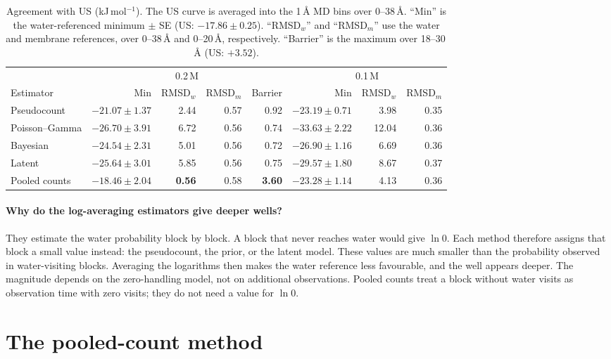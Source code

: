 \documentclass[11pt,a4paper]{article}
\begin{document}
\begin{table}[H]
\centering
\caption{Agreement with US (kJ\,mol$^{-1}$). The US curve is averaged into the 1\,\AA{} MD bins
over 0--38\,\AA{}. ``Min'' is the water-referenced minimum $\pm$ SE (US: $-17.86 \pm 0.25$).
``RMSD$_w$'' and ``RMSD$_m$'' use the water and membrane references, over 0--38\,\AA{} and
0--20\,\AA, respectively. ``Barrier'' is the maximum over 18--30\,\AA{} (US: $+3.52$).}
\label{tab:us}
\small
\setlength{\tabcolsep}{4pt}
\begin{tabular}{l rrrr rrr}
\toprule
 & \multicolumn{4}{c}{0.2\,M} & \multicolumn{3}{c}{0.1\,M} \\
\cmidrule(lr){2-5}\cmidrule(lr){6-8}
Estimator & Min & RMSD$_w$ & RMSD$_m$ & Barrier & Min & RMSD$_w$ & RMSD$_m$ \\
\midrule
Pseudocount   & $-21.07 \pm 1.37$ & 2.44 & 0.57 & 0.92 & $-23.19 \pm 0.71$ & 3.98 & 0.35 \\
Poisson--Gamma& $-26.70 \pm 3.91$ & 6.72 & 0.56 & 0.74 & $-33.63 \pm 2.22$ & 12.04 & 0.36 \\
Bayesian      & $-24.54 \pm 2.31$ & 5.01 & 0.56 & 0.72 & $-26.90 \pm 1.16$ & 6.69 & 0.36 \\
Latent        & $-25.64 \pm 3.01$ & 5.85 & 0.56 & 0.75 & $-29.57 \pm 1.80$ & 8.67 & 0.37 \\
Pooled counts & $\mathbf{-18.46 \pm 2.04}$ & \textbf{0.56} & 0.58 & \textbf{3.60} & $-23.28 \pm 1.14$ & 4.13 & 0.36 \\
\bottomrule
\end{tabular}
\end{table}

\paragraph{Why do the log-averaging estimators give deeper wells?}
They estimate the water probability block by block. A block that never reaches water would
give $\ln 0$. Each method therefore assigns that block a small value instead: the
pseudocount, the prior, or the latent model. These values are much smaller than the
probability observed in water-visiting blocks. Averaging the logarithms then makes the
water reference less favourable, and the well appears deeper. The magnitude depends on the
zero-handling model, not on additional observations. Pooled counts treat a block without
water visits as observation time with zero visits; they do not need a value for $\ln 0$.

\section{The pooled-count method}
\end{document}
